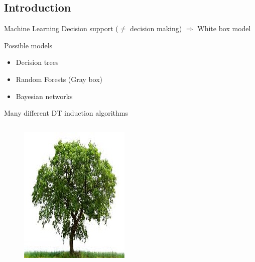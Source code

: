 \documentclass[english]{beamer}
\begin{document}
\subsection*{Introduction}
\begin{frame}{Machine Learning}
	\only<2>{}
	Decision support ($\neq$ decision making) $\Rightarrow$ White box model
	\begin{block}{Possible models}
		\begin{itemize}
			\item { Decision trees}
			\item Random Forests (Gray box)
			\item Bayesian networks
		\end{itemize}
	\end{block}
\end{frame}
\begin{frame}{Many different DT induction algorithms}
	\begin{columns}
		\begin{column}{0.25\textwidth}
			\centering
			\begin{figure}
				\includegraphics[width=\textwidth]{figures/oak.jpg}

\end{figure}
\end{column}
\end{columns}
\end{frame}
\end{document}
